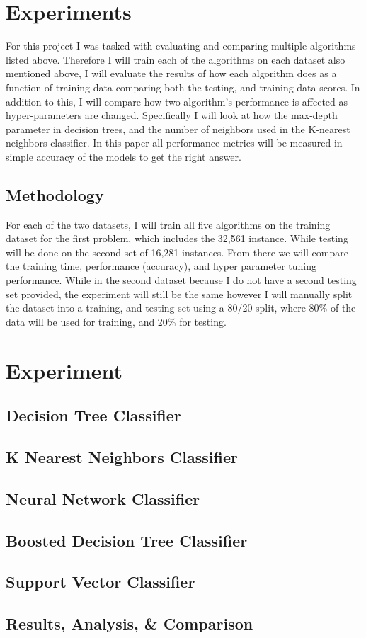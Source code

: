 \documentclass[
	letterpaper, %
]{IEEEtran}
\begin{document}
	\section{Experiments}
	For this project I was tasked with evaluating and comparing multiple algorithms listed above. Therefore I will train each of the algorithms on each dataset also mentioned above, I will evaluate the results of how each algorithm does as a function of training data comparing both the testing, and training data scores. In addition to this, I will compare how two algorithm's performance is affected as hyper-parameters are changed. Specifically I will look at how the max-depth parameter in decision trees, and the number of neighbors used in the K-nearest neighbors classifier. In this paper all performance metrics will be measured in simple accuracy of the models to get the right answer.
	
	\subsection{Methodology}
	For each of the two datasets, I will train all five algorithms on the training dataset for the first problem, which includes the 32,561 instance. While testing will be done on the second set of 16,281 instances. From there we will compare the training time, performance (accuracy), and hyper parameter tuning performance. While in the second dataset because I do not have a second testing set provided, the experiment will still be the same however I will manually split the dataset into a training, and testing set using a 80/20 split, where 80\% of the data will be used for training, and 20\% for testing.
	
	\section{Experiment}
	
	\subsection{Decision Tree Classifier}
	
	\subsection{K Nearest Neighbors Classifier}
	
	\subsection{Neural Network Classifier}
	
	\subsection{Boosted Decision Tree Classifier}
	
	\subsection{Support Vector Classifier}
	
	\subsection{Results, Analysis, \& Comparison}

	
\end{document}

